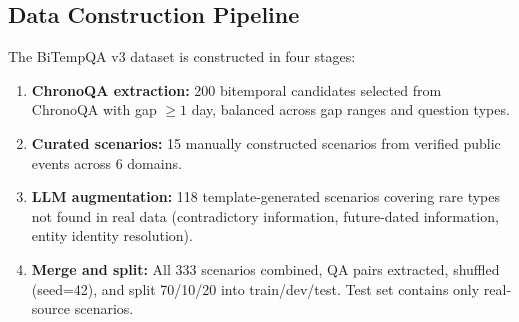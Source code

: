 \begin{table}[h]
\centering
{}
\caption{Manually curated real-world temporal event scenarios. All dates verified from public records and news sources.}
\label{tab:curated}
\end{table}

\subsection{Data Construction Pipeline}

The BiTempQA v3 dataset is constructed in four stages:

\begin{enumerate}
\item \textbf{ChronoQA extraction:} 200 bitemporal candidates selected from ChronoQA with gap $\geq 1$ day, balanced across gap ranges and question types.
\item \textbf{Curated scenarios:} 15 manually constructed scenarios from verified public events across 6 domains.
\item \textbf{LLM augmentation:} 118 template-generated scenarios covering rare types not found in real data (contradictory information, future-dated information, entity identity resolution).
\item \textbf{Merge and split:} All 333 scenarios combined, QA pairs extracted, shuffled (seed=42), and split 70/10/20 into train/dev/test. Test set contains only real-source scenarios.
\end{enumerate}

